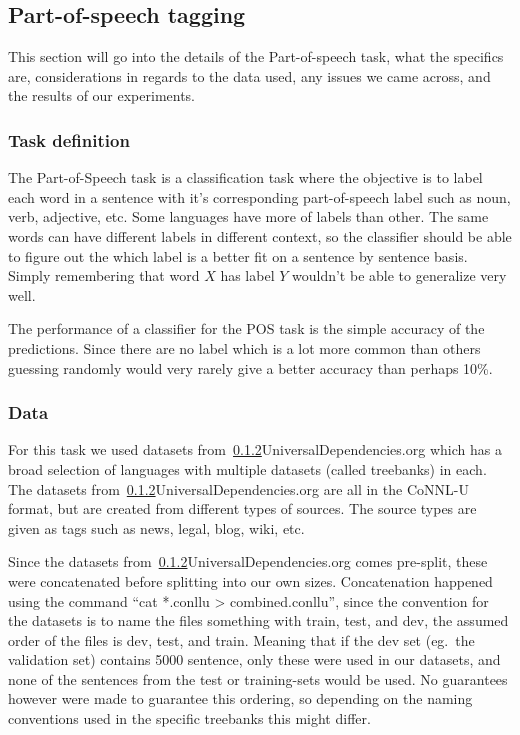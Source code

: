 
\subsection{Part-of-speech tagging}

This section will go into the details of the Part-of-speech task, what the
specifics are, considerations in regards to the data used, any issues we came
across, and the results of our experiments.

\subsubsection{Task definition}

The Part-of-Speech task is a classification task where the objective is to label
each word in a sentence with it's corresponding part-of-speech label such as
noun, verb, adjective, etc. Some languages have more of labels than other. The
same words can have different labels in different context, so the classifier
should be able to figure out the which label is a better fit on a sentence by
sentence basis. Simply remembering that word $X$ has label $Y$ wouldn't be able
to generalize very well.

The performance of a classifier for the POS task is the simple accuracy of the
predictions. Since there are no label which is a lot more common than others
guessing randomly would very rarely give a better accuracy than perhaps 10\%.

\subsubsection{Data}

For this task we used datasets from~\ref{}{UniversalDependencies.org} which has
a broad selection of languages with multiple datasets (called treebanks) in
each. The datasets from~\ref{}{UniversalDependencies.org} are all in the CoNNL-U
format, but are created from different types of sources. The source types are
given as tags such as news, legal, blog, wiki, etc.

Since the datasets from~\ref{}{UniversalDependencies.org} comes pre-split, these
were concatenated before splitting into our own sizes. Concatenation happened
using the command ``cat *.conllu > combined.conllu'', since the convention for
the datasets is to name the files something with train, test, and dev, the
assumed order of the files is dev, test, and train. Meaning that if the dev set
(eg.\ the validation set) contains 5000 sentence, only these were used in our
datasets, and none of the sentences from the test or training-sets would be
used. No guarantees however were made to guarantee this ordering, so depending
on the naming conventions used in the specific treebanks this might differ.

